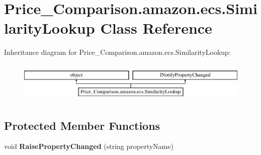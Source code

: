 \hypertarget{class_price___comparison_1_1amazon_1_1ecs_1_1_similarity_lookup}{\section{Price\-\_\-\-Comparison.\-amazon.\-ecs.\-Similarity\-Lookup Class Reference}
\label{class_price___comparison_1_1amazon_1_1ecs_1_1_similarity_lookup}
}


 


Inheritance diagram for Price\-\_\-\-Comparison.\-amazon.\-ecs.\-Similarity\-Lookup\-:\begin{figure}[H]
\begin{center}
\leavevmode
\includegraphics[height=1.924399cm]{class_price___comparison_1_1amazon_1_1ecs_1_1_similarity_lookup}
\end{center}
\end{figure}
\subsection*{Protected Member Functions}
\begin{DoxyCompactItemize}
\item 
\hypertarget{class_price___comparison_1_1amazon_1_1ecs_1_1_similarity_lookup_ae5a833422e7b9b5fb1327e099f9834d6}{void {\bfseries Raise\-Property\-Changed} (string property\-Name)}\label{class_price___comparison_1_1amazon_1_1ecs_1_1_similarity_lookup_ae5a833422e7b9b5fb1327e099f9834d6}

\end{DoxyCompactItemize}
